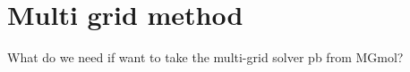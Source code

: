 \section*{Multi grid method}

What do we need if want to take the multi-grid solver pb from MGmol?

